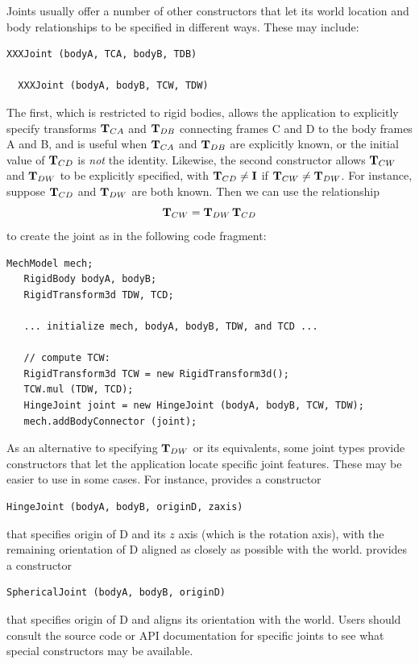 Joints usually offer a number of other constructors that let its world
location and body relationships to be specified in different
ways. These may include:
%
\begin{lstlisting}[]
  XXXJoint (bodyA, TCA, bodyB, TDB)

  XXXJoint (bodyA, bodyB, TCW, TDW)
\end{lstlisting}
%
The first, which is restricted to rigid bodies, allows the application
to explicitly specify transforms ${\bf T}_{CA}$ and ${\bf T}_{DB}$ connecting
frames C and D to the body frames A and B, and is useful when
${\bf T}_{CA}$ and ${\bf T}_{DB}$ are explicitly known, or the initial value of
${\bf T}_{CD}$ is {\it not} the identity. Likewise, the second constructor
allows ${\bf T}_{CW}$ and ${\bf T}_{DW}$ to be explicitly specified, with
${\bf T}_{CD} \ne {\bf I}$ if ${\bf T}_{CW} \ne {\bf T}_{DW}$.  For instance, suppose
${\bf T}_{CD}$ and ${\bf T}_{DW}$ are both known. Then we can use the
relationship
%
\begin{equation}
{\bf T}_{CW} = {\bf T}_{DW} \, {\bf T}_{CD}
\end{equation}
%
to create the joint as in the following code fragment:
%
\begin{lstlisting}[]
   MechModel mech;
   RigidBody bodyA, bodyB;
   RigidTransform3d TDW, TCD;

   ... initialize mech, bodyA, bodyB, TDW, and TCD ...

   // compute TCW:
   RigidTransform3d TCW = new RigidTransform3d();
   TCW.mul (TDW, TCD);
   HingeJoint joint = new HingeJoint (bodyA, bodyB, TCW, TDW);
   mech.addBodyConnector (joint);
\end{lstlisting}
%

As an alternative to specifying ${\bf T}_{DW}$ or its equivalents, some
joint types provide constructors that let the application locate
specific joint features. These may be easier to use in some cases. For
instance,  provides a
constructor
\begin{lstlisting}[]
   HingeJoint (bodyA, bodyB, originD, zaxis)
\end{lstlisting}
%
that specifies origin of D and its $z$ axis (which is the rotation
axis), with the remaining orientation of D aligned as closely as
possible with the world.
 provides a
constructor
\begin{lstlisting}[]
   SphericalJoint (bodyA, bodyB, originD)
\end{lstlisting}
%
that specifies origin of D and aligns its orientation with the world.
Users should consult the source code or API documentation for specific
joints to see what special constructors may be available.


